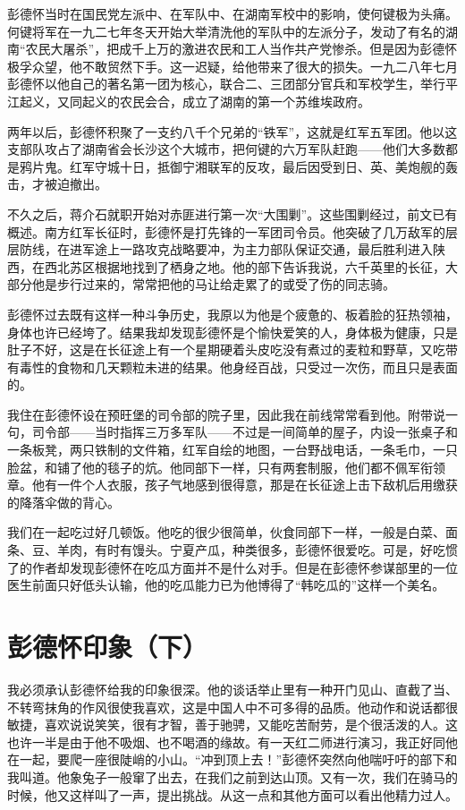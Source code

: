 \documentclass[10pt]{book}
\begin{document}
彭德怀当时在国民党左派中、在军队中、在湖南军校中的影响，使何键极为头痛。何键将军在一九二七年冬天开始大举清洗他的军队中的左派分子，发动了有名的湖南“农民大屠杀”，把成千上万的激进农民和工人当作共产党惨杀。但是因为彭德怀极孚众望，他不敢贸然下手。这一迟疑，给他带来了很大的损失。一九二八年七月彭德怀以他自己的著名第一团为核心，联合二、三团部分官兵和军校学生，举行平江起义，又同起义的农民会合，成立了湖南的第一个苏维埃政府。

两年以后，彭德怀积聚了一支约八千个兄弟的“铁军”，这就是红军五军团。他以这支部队攻占了湖南省会长沙这个大城市，把何键的六万军队赶跑——他们大多数都是鸦片鬼。红军守城十日，抵御宁湘联军的反攻，最后因受到日、英、美炮舰的轰击，才被迫撤出。

不久之后，蒋介石就职开始对赤匪进行第一次“大围剿”。这些围剿经过，前文已有概述。南方红军长征时，彭德怀是打先锋的一军团司令员。他突破了几万敌军的层层防线，在进军途上一路攻克战略要冲，为主力部队保证交通，最后胜利进入陕西，在西北苏区根据地找到了栖身之地。他的部下告诉我说，六千英里的长征，大部分他是步行过来的，常常把他的马让给走累了的或受了伤的同志骑。

彭德怀过去既有这样一种斗争历史，我原以为他是个疲惫的、板着脸的狂热领袖，身体也许已经垮了。结果我却发现彭德怀是个愉快爱笑的人，身体极为健康，只是肚子不好，这是在长征途上有一个星期硬着头皮吃没有煮过的麦粒和野草，又吃带有毒性的食物和几天颗粒未进的结果。他身经百战，只受过一次伤，而且只是表面的。

我住在彭德怀设在预旺堡的司令部的院子里，因此我在前线常常看到他。附带说一句，司令部——当时指挥三万多军队——不过是一间简单的屋子，内设一张桌子和一条板凳，两只铁制的文件箱，红军自绘的地图，一台野战电话，一条毛巾，一只脸盆，和铺了他的毯子的炕。他同部下一样，只有两套制服，他们都不佩军衔领章。他有一件个人衣服，孩子气地感到很得意，那是在长征途上击下敌机后用缴获的降落伞做的背心。

我们在一起吃过好几顿饭。他吃的很少很简单，伙食同部下一样，一般是白菜、面条、豆、羊肉，有时有馒头。宁夏产瓜，种类很多，彭德怀很爱吃。可是，好吃惯了的作者却发现彭德怀在吃瓜方面并不是什么对手。但是在彭德怀参谋部里的一位医生前面只好低头认输，他的吃瓜能力已为他博得了“韩吃瓜的”这样一个美名。

\section{彭德怀印象（下）}

我必须承认彭德怀给我的印象很深。他的谈话举止里有一种开门见山、直截了当、不转弯抹角的作风很使我喜欢，这是中国人中不可多得的品质。他动作和说话都很敏捷，喜欢说说笑笑，很有才智，善于驰骋，又能吃苦耐劳，是个很活泼的人。这也许一半是由于他不吸烟、也不喝酒的缘故。有一天红二师进行演习，我正好同他在一起，要爬一座很陡峭的小山。“冲到顶上去！”彭德怀突然向他喘吁吁的部下和我叫道。他象兔子一般窜了出去，在我们之前到达山顶。又有一次，我们在骑马的时候，他又这样叫了一声，提出挑战。从这一点和其他方面可以看出他精力过人。
\end{document}
